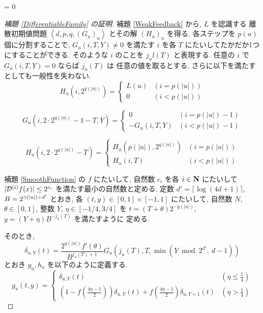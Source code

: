 \ifnum \proc = 0
 \begin{proof}[\rm 補題 \ref{DifferentiableFamily} の証明]
  補題 \ref{WeakFeedback} から, $L$ を認識する 
  離散初期値問題 $\left< d, p, q,(G_u)_u \right>$
  とその解 $(H_u)_u$ を得る.
  各ステップを $p(u)$ 個に分割することで, $G_u(i, T, Y) \not = 0$ を満たす
  $i$ を各 $T$ にたいしてたかだか1つにすることができる. そのような $i$ のことを 
  $j_ul(T)$ と表現する. 任意の $i$ で $G_u(i, T, Y) = 0$ ならば $j_u(T)$ は
  任意の値を取るとする. 
  さらに以下を満たすとしても一般性を失わない.
  \begin{equation}
   H_u(i, 2^{q(|u|)}) = \begin{cases}
			 L(u) & (i=p(|u|)) \\
			0 & (i<p(|u|))
			\end{cases}
  \end{equation}

 \begin{equation}
  G_u(i, 2\cdot 2^{q(|u|)} - 1 - T, Y) 
   = \begin{cases}
      0 & (i=p(|u|)-1) \\
      -G_u(i,T,Y) & (i<p(|u|)-1)
     \end{cases}
 \end{equation}

 \begin{equation}
  H_u(i, 2 \cdot 2^{q(|u|)} - T) 
  = \begin{cases}
    H_u(p(|u|), 2^{q(|u|)}) & (i=p(|u|)) \\
    H_u(i, T) &  (i<p(|u|))
    \end{cases}
 \end{equation}

  補題 \ref{SmoothFunction} の $f$ にたいして, 
 自然数 $c_i$ を各 $i \in \mathbf N$ にたいして 
  $|\mathcal D^{(i)}f(x)| \le 2^{c_i}$ を満たす最小の自然数と定める.
 定数 $d' = \lceil \log (4d + 1) \rceil$, 
 $B = 2^{{\gamma(|u|)} + d'}$ とおき, 
 各 $(t, y) \in [0,1] \times [-1, 1]$ にたいして,
 自然数 $N$, $\theta \in [0,1]$, 整数 $Y$, $\eta \in [-1/4, 3/4]$ を
 $t = (T + \theta)2^{-q(|u|)}$, $y = (Y + \eta)B^{-j_u(T)}$ を満たすように
 定める.
 
 そのとき,
 \begin{equation}
  \delta_{u, Y} (t) = \frac{2^{q(|u|)} f'(\theta)}{B^{j_u(T)+1}} 
   G_u\left( j_u(T), T, \min \left(Y \bmod 2^{d'}\!\!\!,\ d-1 \right) \right)
 \end{equation}
 とおき $g_u, h_u$ を以下のように定義する.
 \begin{equation}
  g_u(t,y) 
  = \begin{cases}
     \delta_{u, Y}(t)& (\eta \le \frac 1 4) \\
     ( 1-f ( \frac{4\eta-1}{2})) \delta_{u, Y}(t) 
     + f ( \frac{4\eta-1}{2}) \delta_{u,Y+1}(t)
     & (\eta > \frac 1 4)
    \end{cases}
  \label{eq:gu}
 \end{equation}


\end{proof}
